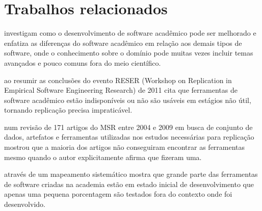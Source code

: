 



\section{Trabalhos relacionados}
\label{sec:trabalhosrelacionados}

investigam como o desenvolvimento de software acadêmico pode ser melhorado e
enfatiza as diferenças do software acadêmico em relação aos demais tipos de
software, onde o conhecimento sobre o domínio pode muitas vezes incluir temas
avançados e pouco comuns fora do meio científico.

ao resumir as conclusões do evento RESER (Workshop on Replication in Empirical
Software Engineering Research) de 2011 cita que ferramentas de software
acadêmico estão indisponíveis ou não são usáveis em estágios não útil, tornando
replicação precisa impraticável.

 num revisão de 171 artigos do MSR entre 2004 e 2009
em busca de conjunto de dados, artefatos e ferramentas utilizadas nos estudos
necessárias para replicação mostrou que a maioria dos artigos não conseguiram encontrar
as ferramentas mesmo quando o autor explicitamente afirma que fizeram uma.


através de um mapeamento sistemático mostra que grande parte das ferramentas de
software criadas na academia estão em estado inicial de desenvolvimento que
apenas uma pequena porcentagem são testados fora do contexto onde foi
desenvolvido. 

